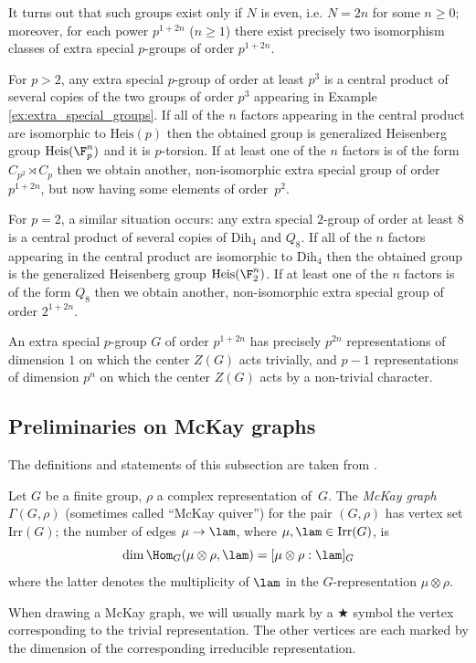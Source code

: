 It turns out that such groups exist only if $N$ is even, i.e. $N=2n$ for some 
$n\geq 0$; moreover, for each power $p^{1+2n}$ ($n\geq 1$) there exist precisely 
two isomorphism classes of extra special $p$-groups of order $p^{1+2n}$. 

For $p>2$, any extra special $p$-group of order at least $p^3$ is a central 
product of several copies of the two groups of order $p^3$ appearing in Example 
\ref{ex:extra_special_groups}. If all of the $n$ factors appearing in the 
central product are isomorphic to $\mathrm{Heis}(p)$ then the obtained group is 
generalized Heisenberg group $\mathrm{Heis}(\F_p^n)$ and it is $p$-torsion. If at least 
one of the $n$ factors is of the form $C_{p^2} \rtimes C_p$ then we obtain 
another, non-isomorphic extra special group of order $p^{1+2n}$, but now having 
some elements of order~$p^2$.

For $p=2$, a similar situation occurs: any extra special $2$-group of order at 
least $8$ is a central product of several copies of $\mathrm{Dih}_4$ and $Q_8$. If 
all of the $n$ factors appearing in the central product are isomorphic to 
$\mathrm{Dih}_4$ then the obtained group is the generalized Heisenberg group 
$\mathrm{Heis}(\F_2^n)$. If at least one of the $n$ factors is of the form $Q_8$ then we 
obtain another, non-isomorphic extra special group of order $2^{1+2n}$.

An extra special $p$-group $G$ of order $p^{1+2n}$ has precisely $p^{2n}$ 
representations of dimension $1$ on which the center $Z(G)$ acts trivially, and 
$p-1$ representations of dimension $p^n$ on which the center $Z(G)$ acts by a 
non-trivial character.

\subsection{Preliminaries on McKay graphs}
The definitions and statements of this subsection are taken from \cite{McKay}.
\begin{defi}
Let $G$ be a finite group, $\rho$ a complex representation of~$G$. The 
{\it McKay graph} $\Gamma(G, \rho)$ (sometimes called ``McKay quiver'') for the 
pair $(G, \rho)$ has vertex set $\mathrm{Irr}(G)$; the number of edges $\mu \to \lam$, 
where $\mu,\lam \in \mathrm{Irr}(G)$, is 
$$\dim \Hom_G(\mu \otimes \rho,\lam) = [\mu\otimes \rho:\lam]_G$$ where the 
latter denotes the multiplicity of $\lam$ in the $G$-representation $\mu\otimes 
\rho$.
\end{defi}
When drawing a McKay graph, we will usually mark by a $\bigstar$ symbol the vertex corresponding to the trivial representation. The other vertices are each marked by the dimension of the corresponding irreducible representation. 

